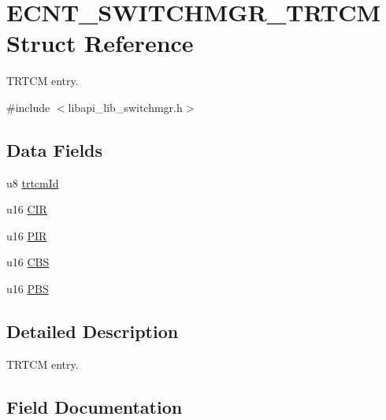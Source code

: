 \hypertarget{structECNT__SWITCHMGR__TRTCM}{}\section{E\+C\+N\+T\+\_\+\+S\+W\+I\+T\+C\+H\+M\+G\+R\+\_\+\+T\+R\+T\+CM Struct Reference}
\label{structECNT__SWITCHMGR__TRTCM}


T\+R\+T\+CM entry.  




{\ttfamily \#include $<$libapi\+\_\+lib\+\_\+switchmgr.\+h$>$}

\subsection*{Data Fields}
\begin{DoxyCompactItemize}
\item 
u8 \hyperlink{structECNT__SWITCHMGR__TRTCM_a28d1d413f5c797b20c6b2875600a97a6}{trtcm\+Id}
\item 
u16 \hyperlink{structECNT__SWITCHMGR__TRTCM_af9a0cd6a7e5d249ceeb29168a6fa086d}{C\+IR}
\item 
u16 \hyperlink{structECNT__SWITCHMGR__TRTCM_a68530f8a1b3e780098c9c7b5c0758e34}{P\+IR}
\item 
u16 \hyperlink{structECNT__SWITCHMGR__TRTCM_a8ecdc3734c3fa74d12f84bffa09def5f}{C\+BS}
\item 
u16 \hyperlink{structECNT__SWITCHMGR__TRTCM_a9fc89d0fd7e2139b4a99f397fb2dfd85}{P\+BS}
\end{DoxyCompactItemize}


\subsection{Detailed Description}
T\+R\+T\+CM entry. 

\subsection{Field Documentation}
\mbox{\label{structECNT__SWITCHMGR__TRTCM_a8ecdc3734c3fa74d12f84bffa09def5f}} 
